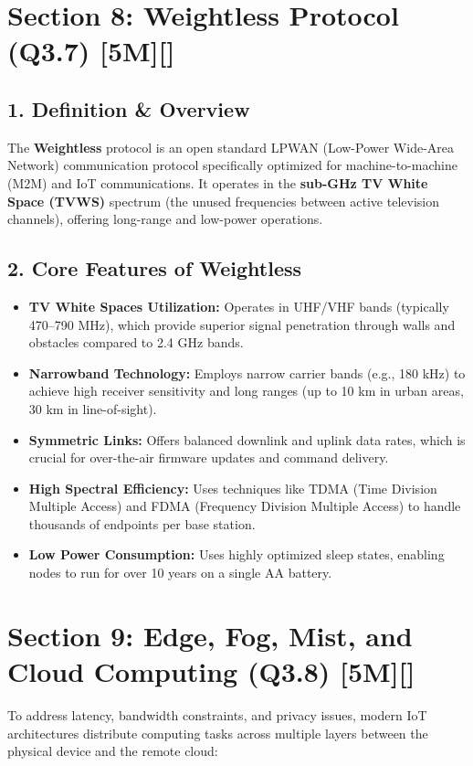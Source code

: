 \section{Section 8: Weightless Protocol (Q3.7) [5M][]}

\subsection{1. Definition \& Overview}
The \textbf{Weightless} protocol is an open standard LPWAN (Low-Power Wide-Area Network) communication protocol specifically optimized for machine-to-machine (M2M) and IoT communications. It operates in the \textbf{sub-GHz TV White Space (TVWS)} spectrum (the unused frequencies between active television channels), offering long-range and low-power operations.

\subsection{2. Core Features of Weightless}
\begin{itemize}
  \item   \textbf{TV White Spaces Utilization:} Operates in UHF/VHF bands (typically 470–790 MHz), which provide superior signal penetration through walls and obstacles compared to 2.4 GHz bands.
  \item   \textbf{Narrowband Technology:} Employs narrow carrier bands (e.g., 180 kHz) to achieve high receiver sensitivity and long ranges (up to 10 km in urban areas, 30 km in line-of-sight).
  \item   \textbf{Symmetric Links:} Offers balanced downlink and uplink data rates, which is crucial for over-the-air firmware updates and command delivery.
  \item   \textbf{High Spectral Efficiency:} Uses techniques like TDMA (Time Division Multiple Access) and FDMA (Frequency Division Multiple Access) to handle thousands of endpoints per base station.
  \item   \textbf{Low Power Consumption:} Uses highly optimized sleep states, enabling nodes to run for over 10 years on a single AA battery.
\end{itemize}


\section{Section 9: Edge, Fog, Mist, and Cloud Computing (Q3.8) [5M][]}

To address latency, bandwidth constraints, and privacy issues, modern IoT architectures distribute computing tasks across multiple layers between the physical device and the remote cloud:

